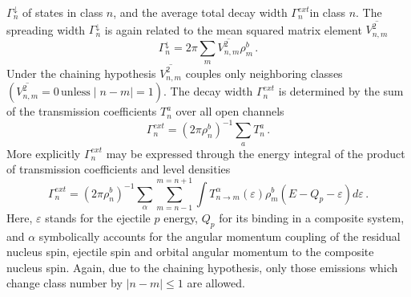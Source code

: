 \documentclass[twocolumn,amsmath,amssymb,10pt,groupedaddress,letter]{revtex4}
\begin{document}
$\Gamma_{n}^{\downarrow}$ of states in class $n$, and the average
total decay width $\Gamma_{n}^{ext}$in class $n$. The spreading
width $\Gamma_{n}^{\downarrow}$ is again related to the mean squared
matrix element $\overline{V_{n,m}^{2}}$
\begin{equation}
\Gamma_{n}^{\downarrow}=2\pi\sum_{m}\overline{V_{n,m}^{2}}\rho_{m}^{b}\,.
\label{GdownMSC}
\end{equation}
Under the chaining hypothesis $\overline{V_{n,m}^{2}}$ couples only
neighboring classes $(\overline{V_{n,m}^{2}}=0\,{\textrm{unless}}\mid n-m\mid=1)$.
The decay width $\Gamma_{n}^{ext}$ is determined by the sum of the
transmission coefficients $T_{n}^{a}$ over all open channels
\begin{equation}
\Gamma_{n}^{ext}=(2\pi\rho_{n}^{b})^{-1}\sum_{a}T_{n}^{a}\,.
\end{equation}
More explicitly $\Gamma_{n}^{ext}$ may be expressed through the energy
integral of the product of transmission coefficients and level densities
\begin{equation}
\Gamma_{n}^{ext}=(2\pi\rho_{n}^{b})^{-1}\sum_{\alpha}\sum_{m=n-1}^{m=n+1}\int T_{n\rightarrow m}^{\alpha}(\varepsilon)\rho_{m}^{b}(E-Q_{p}-\varepsilon)d\varepsilon\,.
\label{Gammext}
\end{equation}
Here, $\varepsilon$ stands for the ejectile $p$ energy, $Q_{p}$
for its binding in a composite system, and $\alpha$ symbolically
accounts for the angular momentum coupling of the residual nucleus
spin, ejectile spin and orbital angular momentum to the composite
nucleus spin. Again, due to the chaining hypothesis, only those emissions
which change class number by $\mid n-m\mid\leq1$ are allowed.
\end{document}
